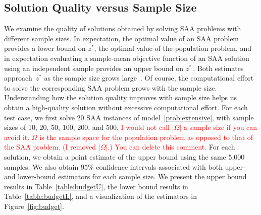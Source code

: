 \documentclass[11pt]{article}
\newcommand{\tcr}{\textcolor{red}}
\begin{document}
	\subsection{Solution Quality versus Sample Size} \label{subsec:budget}
	We examine the quality of solutions obtained by solving SAA problems with different sample sizes. In expectation, the optimal value of an SAA problem provides a lower bound on $z^*$, the optimal value of the population problem, and in expectation evaluating a sample-mean objective function of an SAA solution using an independent sample provides an upper bound on $z^* \,$\citep{mak_etal_1999}. Both estimates approach~$z^*$ as the sample size grows large~\citep[e.g.,][]{shapiro2009lectures}. Of course, the computational effort to solve the corresponding SAA problem grows with the sample size. Understanding how the solution quality improves with sample size helps us obtain a high-quality solution without excessive computational effort. For each test case, we first solve \(20\) SAA instances of model~\eqref{prob:extensive}, with sample sizes of 10, 20, 50, 100, 200, and 500. \tcr{I would not call $|\Omega|$ a sample size if you can avoid it. $\Omega$ is the sample space for the population problem as opposed to that of the SAA problem. (I removed $|\Omega|$.) You can delete this comment.} For each solution, we obtain a point estimate of the upper bound using the same 5,000 samples. We also obtain 95\% confidence intervals associated with both upper- and lower-bound estimators for each sample size. We present the upper bound results in Table~\ref{table:budgetU}, the lower bound results in Table~\ref{table:budgetL}, and a visualization of the estimators in Figure~\ref{fig:budget}.
	
\end{document}
